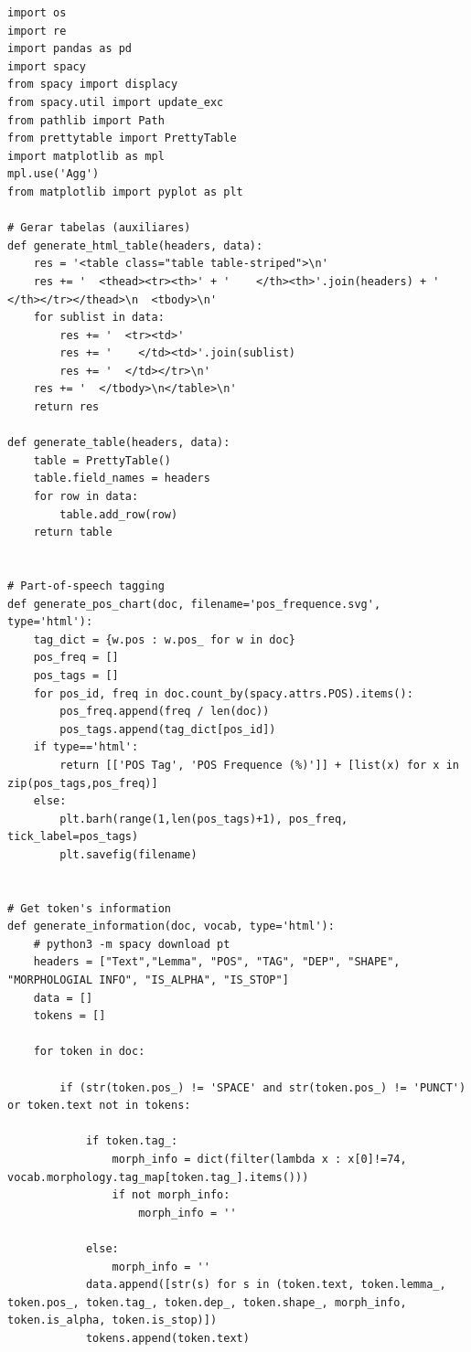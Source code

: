 \documentclass[12pt]{article}
\begin{document}
\begin{verbatim}
import os
import re
import pandas as pd
import spacy
from spacy import displacy
from spacy.util import update_exc
from pathlib import Path
from prettytable import PrettyTable
import matplotlib as mpl
mpl.use('Agg')
from matplotlib import pyplot as plt

# Gerar tabelas (auxiliares)
def generate_html_table(headers, data):
    res = '<table class="table table-striped">\n'
    res += '  <thead><tr><th>' + '    </th><th>'.join(headers) + '  </th></tr></thead>\n  <tbody>\n'
    for sublist in data:
        res += '  <tr><td>'
        res += '    </td><td>'.join(sublist)
        res += '  </td></tr>\n'
    res += '  </tbody>\n</table>\n'
    return res

def generate_table(headers, data):
    table = PrettyTable()
    table.field_names = headers
    for row in data:
        table.add_row(row)
    return table


# Part-of-speech tagging
def generate_pos_chart(doc, filename='pos_frequence.svg', type='html'):
    tag_dict = {w.pos : w.pos_ for w in doc}
    pos_freq = []
    pos_tags = []
    for pos_id, freq in doc.count_by(spacy.attrs.POS).items():
        pos_freq.append(freq / len(doc))
        pos_tags.append(tag_dict[pos_id])
    if type=='html':
        return [['POS Tag', 'POS Frequence (%)']] + [list(x) for x in zip(pos_tags,pos_freq)]
    else:
        plt.barh(range(1,len(pos_tags)+1), pos_freq, tick_label=pos_tags)
        plt.savefig(filename)


# Get token's information
def generate_information(doc, vocab, type='html'):
    # python3 -m spacy download pt
    headers = ["Text","Lemma", "POS", "TAG", "DEP", "SHAPE", "MORPHOLOGIAL INFO", "IS_ALPHA", "IS_STOP"]
    data = []
    tokens = []

    for token in doc:

        if (str(token.pos_) != 'SPACE' and str(token.pos_) != 'PUNCT') or token.text not in tokens:

            if token.tag_:
                morph_info = dict(filter(lambda x : x[0]!=74, vocab.morphology.tag_map[token.tag_].items()))
                if not morph_info:
                    morph_info = ''

            else:
                morph_info = ''
            data.append([str(s) for s in (token.text, token.lemma_, token.pos_, token.tag_, token.dep_, token.shape_, morph_info, token.is_alpha, token.is_stop)])
            tokens.append(token.text)


\end{verbatim}
\end{document}
